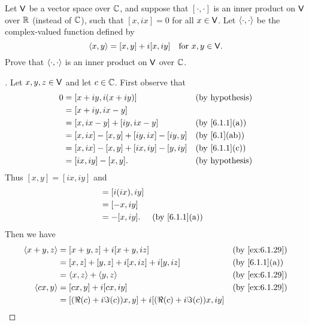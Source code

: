 \begin{ex}\label{ex:6.1.29}
	Let \(\mathsf{V}\) be a vector space over \(\mathbb{C}\), and suppose that \([\cdot, \cdot]\) is an inner product on \(\mathsf{V}\) over \(\mathbb{R}\) (instead of \(\mathbb{C}\)), such that \([x, ix] = 0\) for all \(x \in \mathsf{V}\).
	Let \(\left\langle\cdot, \cdot\right\rangle\) be the complex-valued function defined by
	\[
		\left\langle x, y\right\rangle = [x, y] + i[x, iy] \quad \text{for } x, y \in \mathsf{V}.
	\]
	Prove that \(\left\langle\cdot, \cdot\right\rangle\) is an inner product on \(\mathsf{V}\) over \(\mathbb{C}\).
\end{ex}

\begin{proof}[]
	Let \(x, y, z \in \mathsf{V}\) and let \(c \in \mathbb{C}\).
	First observe that
	\begin{align*}
		0 & = [x + iy, i(x + iy)]                   &  & \text{(by hypothesis)} \\
		  & = [x + iy, ix - y]                                                  \\
		  & = [x, ix - y] + [iy, ix - y]            &  & \by{6.1.1}[a]          \\
		  & = [x, ix] - [x, y] + [iy, ix] - [iy, y] &  & \by{6.1}[ab]           \\
		  & = [x, ix] - [x, y] + [ix, iy] - [y, iy] &  & \by{6.1.1}[c]          \\
		  & = [ix, iy] - [x, y].                    &  & \text{(by hypothesis)}
	\end{align*}
	Thus \([x, y] = [ix, iy]\) and
	\begin{align*}
		[ix, y] & = [i(ix), iy]                    \\
		        & = [-x, iy]                       \\
		        & = -[x, iy].   &  & \by{6.1.1}[a]
	\end{align*}
	Then we have
	\begin{align*}
		\inn{x + y, z}    & = [x + y, z] + i[x + y, iz]                                 &  & \by{ex:6.1.29}                \\
		                  & = [x, z] + [y, z] + i[x, iz] + i[y, iz]                     &  & \by{6.1.1}[a]                 \\
		                  & = \inn{x, z} + \inn{y, z}                                   &  & \by{ex:6.1.29}                \\
		\inn{cx, y}       & = [cx, y] + i[cx, iy]                                       &  & \by{ex:6.1.29}                \\
		                  & = [(\Re(c) + i \Im(c)) x, y] + i[(\Re(c) + i \Im(c)) x, iy]                                    \\

\end{align*}
\end{proof}
